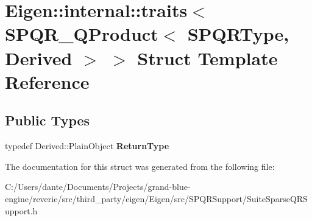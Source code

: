 \hypertarget{struct_eigen_1_1internal_1_1traits_3_01_s_p_q_r___q_product_3_01_s_p_q_r_type_00_01_derived_01_4_01_4}{}\section{Eigen\+::internal\+::traits$<$ S\+P\+Q\+R\+\_\+\+Q\+Product$<$ S\+P\+Q\+R\+Type, Derived $>$ $>$ Struct Template Reference}
\label{struct_eigen_1_1internal_1_1traits_3_01_s_p_q_r___q_product_3_01_s_p_q_r_type_00_01_derived_01_4_01_4}
\subsection*{Public Types}
\begin{DoxyCompactItemize}
\item 
\mbox{\label{struct_eigen_1_1internal_1_1traits_3_01_s_p_q_r___q_product_3_01_s_p_q_r_type_00_01_derived_01_4_01_4_ab2bb8a51d34349489fc6ac9d15dda5e0}} 
typedef Derived\+::\+Plain\+Object {\bfseries Return\+Type}
\end{DoxyCompactItemize}


The documentation for this struct was generated from the following file\+:\begin{DoxyCompactItemize}
\item 
C\+:/\+Users/dante/\+Documents/\+Projects/grand-\/blue-\/engine/reverie/src/third\+\_\+party/eigen/\+Eigen/src/\+S\+P\+Q\+R\+Support/Suite\+Sparse\+Q\+R\+Support.\+h\end{DoxyCompactItemize}
